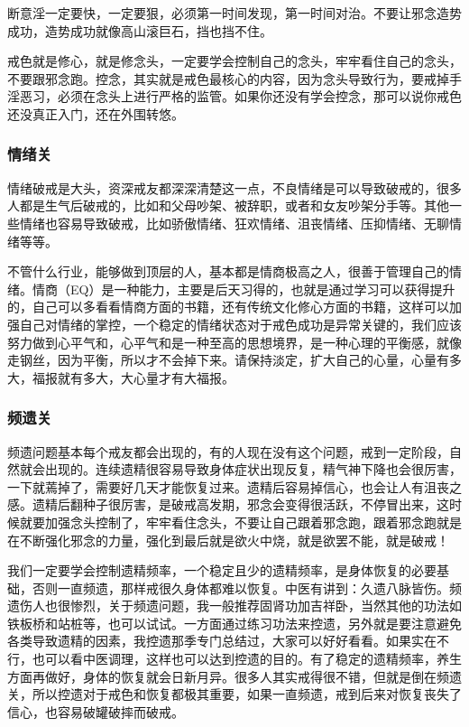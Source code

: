\documentclass{ctexart}
\begin{document}
断意淫一定要快，一定要狠，必须第一时间发现，第一时间对治。不要让邪念造势成功，造势成功就像高山滚巨石，挡也挡不住。

戒色就是修心，就是修念头，一定要学会控制自己的念头，牢牢看住自己的念头，不要跟邪念跑。控念，其实就是戒色最核心的内容，因为念头导致行为，要戒掉手淫恶习，必须在念头上进行严格的监管。如果你还没有学会控念，那可以说你戒色还没真正入门，还在外围转悠。

\subsubsection{情绪关}

情绪破戒是大头，资深戒友都深深清楚这一点，不良情绪是可以导致破戒的，很多人都是生气后破戒的，比如和父母吵架、被辞职，或者和女友吵架分手等。其他一些情绪也容易导致破戒，比如骄傲情绪、狂欢情绪、沮丧情绪、压抑情绪、无聊情绪等等。

不管什么行业，能够做到顶层的人，基本都是情商极高之人，很善于管理自己的情绪。情商（EQ）是一种能力，主要是后天习得的，也就是通过学习可以获得提升的，自己可以多看看情商方面的书籍，还有传统文化修心方面的书籍，这样可以加强自己对情绪的掌控，一个稳定的情绪状态对于戒色成功是异常关键的，我们应该努力做到心平气和，心平气和是一种至高的思想境界，是一种心理的平衡感，就像走钢丝，因为平衡，所以才不会掉下来。请保持淡定，扩大自己的心量，心量有多大，福报就有多大，大心量才有大福报。

\subsubsection{频遗关}

频遗问题基本每个戒友都会出现的，有的人现在没有这个问题，戒到一定阶段，自然就会出现的。连续遗精很容易导致身体症状出现反复，精气神下降也会很厉害，一下就蔫掉了，需要好几天才能恢复过来。遗精后容易掉信心，也会让人有沮丧之感。遗精后翻种子很厉害，是破戒高发期，邪念会变得很活跃，不停冒出来，这时候就要加强念头控制了，牢牢看住念头，不要让自己跟着邪念跑，跟着邪念跑就是在不断强化邪念的力量，强化到最后就是欲火中烧，就是欲罢不能，就是破戒！

我们一定要学会控制遗精频率，一个稳定且少的遗精频率，是身体恢复的必要基础，否则一直频遗，那样戒很久身体都难以恢复。中医有讲到：久遗八脉皆伤。频遗伤人也很惨烈，关于频遗问题，我一般推荐固肾功加吉祥卧，当然其他的功法如铁板桥和站桩等，也可以试试。一方面通过练习功法来控遗，另外就是要注意避免各类导致遗精的因素，我控遗那季专门总结过，大家可以好好看看。如果实在不行，也可以看中医调理，这样也可以达到控遗的目的。有了稳定的遗精频率，养生方面再做好，身体的恢复就会日新月异。很多人其实戒得很不错，但就是倒在频遗关，所以控遗对于戒色和恢复都极其重要，如果一直频遗，戒到后来对恢复丧失了信心，也容易破罐破摔而破戒。
\end{document}
